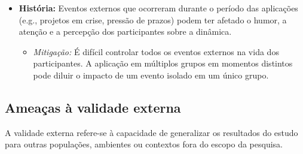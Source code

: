 \documentclass[
	12pt,
	openright,
	twoside,
	a4paper,
	english,
	brazil
	]{abntex2}
\begin{document}
\begin{itemize}
\begin{itemize}
    \end{itemize}
  \item \textbf{História:} Eventos externos que ocorreram durante o período das aplicações (e.g., projetos em crise, pressão de prazos) podem ter afetado o humor, a atenção e a percepção dos participantes sobre a dinâmica.
    \begin{itemize}
    \item \textit{Mitigação:} É difícil controlar todos os eventos externos na vida dos participantes. A aplicação em múltiplos grupos em momentos distintos pode diluir o impacto de um evento isolado em um único grupo.
    \end{itemize}
\end{itemize}

\subsection{Ameaças à validade externa}
\label{sec:ameacas-externa}

A validade externa refere-se à capacidade de generalizar os resultados do estudo para outras populações, ambientes ou contextos fora do escopo da pesquisa.
\end{document}
